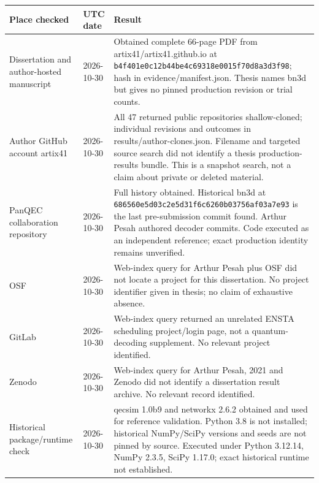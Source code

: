 \begin{longtable}{p{.21\linewidth}p{.12\linewidth}p{.59\linewidth}}
\toprule
Place checked & UTC date & Result\\
\midrule\endhead
Dissertation and author-hosted manuscript & 2026-10-30 & Obtained complete 66-page PDF from artix41/artix41.github.io at \nolinkurl{b4f401e0c12b44be4c69318e0015f70d8a3d3f98}; hash in evidence/manifest.json. Thesis names bn3d but gives no pinned production revision or trial counts.\\
Author GitHub account artix41 & 2026-10-30 & All 47 returned public repositories shallow-cloned; individual revisions and outcomes in results/author-clones.json. Filename and targeted source search did not identify a thesis production-results bundle. This is a snapshot search, not a claim about private or deleted material.\\
PanQEC collaboration repository & 2026-10-30 & Full history obtained. Historical bn3d at \nolinkurl{686560e5d03c2e5d31f6c6260b03756af03a7e93} is the last pre-submission commit found. Arthur Pesah authored decoder commits. Code executed as an independent reference; exact production identity remains unverified.\\
OSF & 2026-10-30 & Web-index query for Arthur Pesah plus OSF did not locate a project for this dissertation. No project identifier given in thesis; no claim of exhaustive absence.\\
GitLab & 2026-10-30 & Web-index query returned an unrelated ENSTA scheduling project/login page, not a quantum-decoding supplement. No relevant project identified.\\
Zenodo & 2026-10-30 & Web-index query for Arthur Pesah, 2021 and Zenodo did not identify a dissertation result archive. No relevant record identified.\\
Historical package/runtime check & 2026-10-30 & qecsim 1.0b9 and networkx 2.6.2 obtained and used for reference validation. Python 3.8 is not installed; historical NumPy/SciPy versions and seeds are not pinned by source. Executed under Python 3.12.14, NumPy 2.3.5, SciPy 1.17.0; exact historical runtime not established.\\
\bottomrule
\end{longtable}
